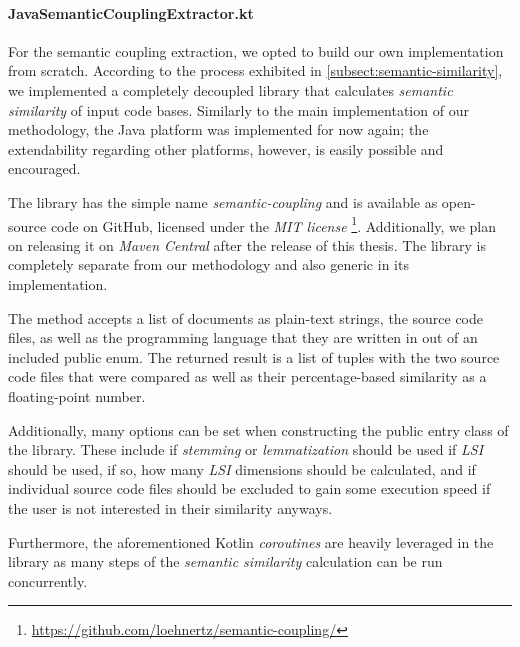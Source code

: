 \documentclass[12pt,a4paper]{report}
\begin{document}
\paragraph{JavaSemanticCouplingExtractor.kt}
For the semantic coupling
extraction, we opted to build our own implementation from scratch. According to
the process exhibited in \ref{subsect:semantic-similarity}, we implemented a
completely decoupled library that calculates \textit{semantic similarity} of
input code bases. Similarly to the main implementation of our methodology, the
Java platform was implemented for now again; the extendability regarding other
platforms, however, is easily possible and encouraged.

The library has the simple name \textit{semantic-coupling} and is available as
open-source code on GitHub, licensed under the \textit{MIT license} \footnote{
\url{https://github.com/loehnertz/semantic-coupling/}}. Additionally, we plan
on releasing it on \textit{Maven Central} after the release of this thesis. The
library is completely separate from our methodology and also generic in its
implementation.

The  method accepts a list of documents as plain-text strings, the
source code files, as well as the programming language that they are written in
out of an included public enum. The returned result is a list of tuples with
the two source code files that were compared as well as their percentage-based
similarity as a floating-point number.

Additionally, many options can be set when constructing the public entry class
of the library. These include if \textit{stemming} or \textit{lemmatization}
should be used if \textit{LSI} should be used, if so, how many \textit{LSI}
dimensions should be calculated, and if individual source code files should be
excluded to gain some execution speed if the user is not interested in their
similarity anyways.

Furthermore, the aforementioned Kotlin \textit{coroutines} are heavily
leveraged in the library as many steps of the \textit{semantic similarity}
calculation can be run concurrently.
\end{document}
